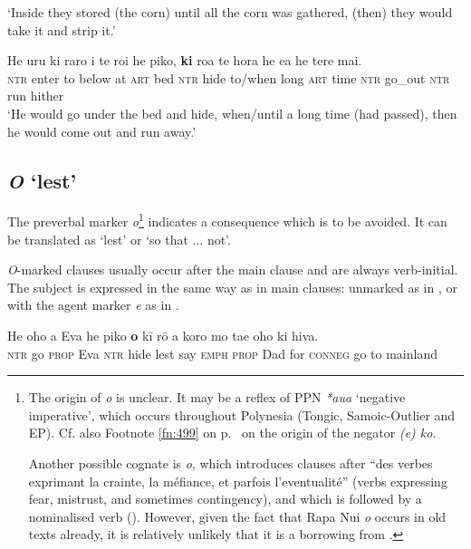 \glt 
‘Inside they stored (the corn) until all the corn was gathered, (then) they would take it and strip it.’ \textstyleExampleref{[R250.068]} 
\z

\ea\label{ex:11.199}
\gll He uru ki raro i te ro{\ꞌ}i he piko, \textbf{ki} roa te hora he e{\ꞌ}a  he tere mai.\\
\textsc{ntr} enter to below at \textsc{art} bed \textsc{ntr} hide to/when long \textsc{art} time \textsc{ntr} go\_out  \textsc{ntr} run hither\\

\glt 
‘He would go under the bed and hide, when/until a long time (had passed), then he would come out and run away.’ \textstyleExampleref{[R250.185]} 
\z
{}

\subsection{\textit{{\ꞌ}O} ‘lest’}\label{sec:11.5.4}
The preverbal marker \textit{{\ꞌ}o}\footnote{\label{fn:527}The origin of \textit{{\ꞌ}o} is unclear. It may be a reflex of PPN \textit{*{\ꞌ}aua} ‘negative imperative’, which occurs throughout Polynesia (Tongic, Samoic-Outlier and EP). Cf. also Footnote \ref{fn:499} on p.~\pageref{fn:499} on the origin of the negator \textit{(e) ko}.

Another possible cognate is  \textit{{\ꞌ}o}, which introduces clauses after “des verbes exprimant la crainte, la méfiance, et parfois l’eventualité” (verbs expressing fear, mistrust, and sometimes contingency), and which is followed by a nominalised verb (\citealt[197]{AcadémieTahitienne1986}). However, given the fact that Rapa Nui \textit{{\ꞌ}o} occurs in old texts already, it is relatively unlikely that it is a borrowing from .} indicates a consequence which is to be avoided. It can be translated as ‘lest’ or ‘so that ... not’.

\textit{{\ꞌ}O}{}-marked clauses usually occur after the main clause and are always verb-initial. The subject is expressed in the same way as in main clauses: unmarked as in , or with the agent marker \textit{e} as in . 

\ea\label{ex:11.200}
\gll He oho a Eva he piko \textbf{{\ꞌ}o} kī rō a koro mo ta{\ꞌ}e oho ki hiva.\\
\textsc{ntr} go \textsc{prop} Eva \textsc{ntr} hide lest say \textsc{emph} \textsc{prop} Dad for \textsc{conneg} go to mainland\\

